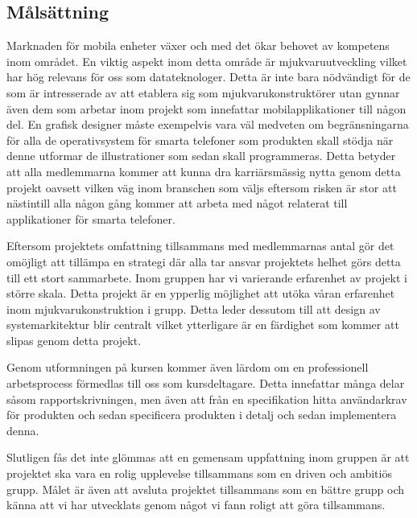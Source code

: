\subsection{Målsättning}
Marknaden för mobila enheter växer och med det ökar behovet av kompetens inom området. En viktig aspekt inom detta område är mjukvaruutveckling vilket har hög relevans för oss som datateknologer. Detta är inte bara nödvändigt för de som är intresserade av att etablera sig som mjukvarukonstruktörer utan gynnar även dem som arbetar inom projekt som innefattar mobilapplikationer till någon del. En grafisk designer måste exempelvis vara väl medveten om begränsningarna för alla de operativsystem för smarta telefoner som produkten skall stödja när denne utformar de illustrationer som sedan skall programmeras. Detta betyder att alla medlemmarna kommer att kunna dra karriärsmässig nytta genom detta projekt oavsett vilken väg inom branschen som väljs eftersom risken är stor att nästintill alla någon gång kommer att arbeta med något relaterat till applikationer för smarta telefoner.

Eftersom projektets omfattning tillsammans med medlemmarnas antal gör det omöjligt att tillämpa en strategi där alla tar ansvar projektets helhet görs detta till ett stort sammarbete. Inom gruppen har vi varierande erfarenhet av projekt i större skala. Detta projekt är en ypperlig möjlighet att utöka våran erfarenhet inom mjukvarukonstruktion i grupp. Detta leder dessutom till att design av systemarkitektur blir centralt vilket ytterligare är en färdighet som kommer att slipas genom detta projekt.

Genom utformningen på kursen kommer även lärdom om en professionell arbetsprocess förmedlas till oss som kursdeltagare. Detta innefattar många delar såsom rapportskrivningen, men även att från en specifikation hitta användarkrav för produkten och sedan specificera produkten i detalj och sedan implementera denna.

Slutligen fås det inte glömmas att en gemensam uppfattning inom gruppen är att projektet ska vara en rolig upplevelse tillsammans som en driven och ambitiös grupp. Målet är även att avsluta projektet tillsammans som en bättre grupp och känna att vi har utvecklats genom något vi fann roligt att göra tillsammans. 
